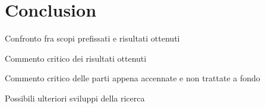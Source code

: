 \chapter{Conclusion}

	Confronto fra scopi prefissati e risultati ottenuti
	
	Commento critico dei risultati ottenuti
	
	Commento critico delle parti appena accennate e non trattate a fondo
	
	Possibili ulteriori sviluppi della ricerca